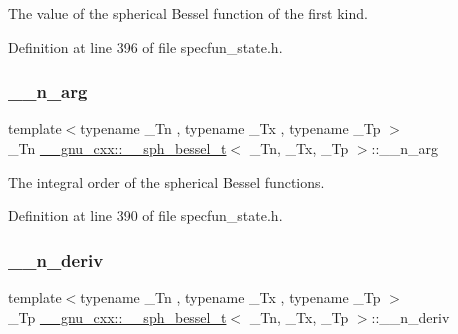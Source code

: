 The value of the spherical Bessel function of the first kind. 



Definition at line 396 of file specfun\+\_\+state.\+h.

\mbox{\label{struct____gnu__cxx_1_1____sph__bessel__t_a002325ca0f884fb872e1d211e7885d58}} 
\subsubsection{\texorpdfstring{\+\_\+\+\_\+n\+\_\+arg}{\_\_n\_arg}}
{\footnotesize\ttfamily template$<$typename \+\_\+\+Tn , typename \+\_\+\+Tx , typename \+\_\+\+Tp $>$ \\
\+\_\+\+Tn \hyperlink{struct____gnu__cxx_1_1____sph__bessel__t}{\+\_\+\+\_\+gnu\+\_\+cxx\+::\+\_\+\+\_\+sph\+\_\+bessel\+\_\+t}$<$ \+\_\+\+Tn, \+\_\+\+Tx, \+\_\+\+Tp $>$\+::\+\_\+\+\_\+n\+\_\+arg}



The integral order of the spherical Bessel functions. 



Definition at line 390 of file specfun\+\_\+state.\+h.

\mbox{\label{struct____gnu__cxx_1_1____sph__bessel__t_a84247b0cc2295f300c523d85a3cc601f}} 
\subsubsection{\texorpdfstring{\+\_\+\+\_\+n\+\_\+deriv}{\_\_n\_deriv}}
{\footnotesize\ttfamily template$<$typename \+\_\+\+Tn , typename \+\_\+\+Tx , typename \+\_\+\+Tp $>$ \\
\+\_\+\+Tp \hyperlink{struct____gnu__cxx_1_1____sph__bessel__t}{\+\_\+\+\_\+gnu\+\_\+cxx\+::\+\_\+\+\_\+sph\+\_\+bessel\+\_\+t}$<$ \+\_\+\+Tn, \+\_\+\+Tx, \+\_\+\+Tp $>$\+::\+\_\+\+\_\+n\+\_\+deriv}




